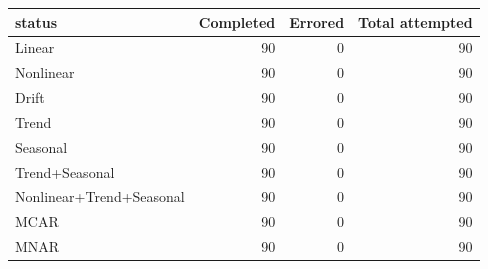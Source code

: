 \begin{tabular}{lrrr}
\toprule
status & Completed & Errored & Total attempted \\
\midrule
Linear & 90 & 0 & 90 \\
Nonlinear & 90 & 0 & 90 \\
Drift & 90 & 0 & 90 \\
Trend & 90 & 0 & 90 \\
Seasonal & 90 & 0 & 90 \\
Trend+Seasonal & 90 & 0 & 90 \\
Nonlinear+Trend+Seasonal & 90 & 0 & 90 \\
MCAR & 90 & 0 & 90 \\
MNAR & 90 & 0 & 90 \\
\bottomrule
\end{tabular}
